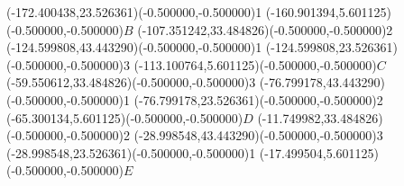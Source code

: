 \ASYalign(-172.400438,23.526361)(-0.500000,-0.500000){1}%
\color{ASYcolor}
\fontsize{12.000000}{14.400000}\selectfont
\ASYalign(-160.901394,5.601125)(-0.500000,-0.500000){$B$}%
\color{ASYcolor}
\fontsize{12.000000}{14.400000}\selectfont
\ASYalign(-107.351242,33.484826)(-0.500000,-0.500000){2}%
\color{ASYcolor}
\fontsize{12.000000}{14.400000}\selectfont
\ASYalign(-124.599808,43.443290)(-0.500000,-0.500000){1}%
\color{ASYcolor}
\fontsize{12.000000}{14.400000}\selectfont
\ASYalign(-124.599808,23.526361)(-0.500000,-0.500000){3}%
\color{ASYcolor}
\fontsize{12.000000}{14.400000}\selectfont
\ASYalign(-113.100764,5.601125)(-0.500000,-0.500000){$C$}%
\color{ASYcolor}
\fontsize{12.000000}{14.400000}\selectfont
\ASYalign(-59.550612,33.484826)(-0.500000,-0.500000){3}%
\color{ASYcolor}
\fontsize{12.000000}{14.400000}\selectfont
\ASYalign(-76.799178,43.443290)(-0.500000,-0.500000){1}%
\color{ASYcolor}
\fontsize{12.000000}{14.400000}\selectfont
\ASYalign(-76.799178,23.526361)(-0.500000,-0.500000){2}%
\color{ASYcolor}
\fontsize{12.000000}{14.400000}\selectfont
\ASYalign(-65.300134,5.601125)(-0.500000,-0.500000){$D$}%
\color{ASYcolor}
\fontsize{12.000000}{14.400000}\selectfont
\ASYalign(-11.749982,33.484826)(-0.500000,-0.500000){2}%
\color{ASYcolor}
\fontsize{12.000000}{14.400000}\selectfont
\ASYalign(-28.998548,43.443290)(-0.500000,-0.500000){3}%
\color{ASYcolor}
\fontsize{12.000000}{14.400000}\selectfont
\ASYalign(-28.998548,23.526361)(-0.500000,-0.500000){1}%
\color{ASYcolor}
\fontsize{12.000000}{14.400000}\selectfont
\ASYalign(-17.499504,5.601125)(-0.500000,-0.500000){$E$}%
